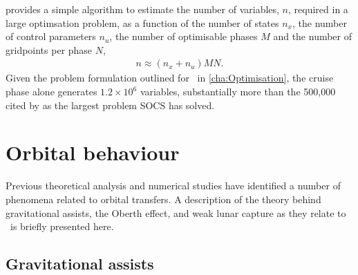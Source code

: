 \textcite{Betts1998} provides a simple algorithm to estimate the number of variables, $n$, required in a large optimsation problem, as a function of the number of states $n_x$, the number of control parameters $n_u$, the number of optimisable phases $M$ and the number of gridpoints per phase $N$,
\begin{gather}
n \approx (n_x + n_u)MN. %
\end{gather} %
Given the problem formulation outlined for \BW\ in \autoref{cha:Optimisation}, the cruise phase alone generates $1.2\times10^6$ variables, substantially more than the 500,000 cited by \textcite{ASTOS_guide} as the largest problem SOCS has solved. %





\section{Orbital behaviour}

Previous theoretical analysis and numerical studies have identified a number of phenomena related to orbital transfers. A description of the theory behind gravitational assists, the Oberth effect, and weak lunar capture as they relate to \BW\ is briefly presented here.

\subsection{Gravitational assists} \label{sub:Grav-assist}

